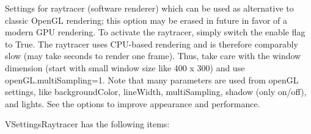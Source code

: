 
\label{sec:VSettingsRaytracer}
Settings for raytracer (software renderer) which can be used as alternative to classic OpenGL rendering; this option may be erased in future in favor of a modern GPU rendering. To activate the raytracer, simply switch the enable flag to True. The raytracer uses CPU-based rendering and is therefore comparably slow (may take seconds to render one frame). Thus, take care with the window dimension (start with small window size like 400 x 300) and use openGL.multiSampling=1. Note that many parameters are used from openGL settings, like backgroundColor, lineWidth, multiSampling, shadow (only on/off), and lights. See the options to improve appearance and performance.

\noindent VSettingsRaytracer has the following items:
